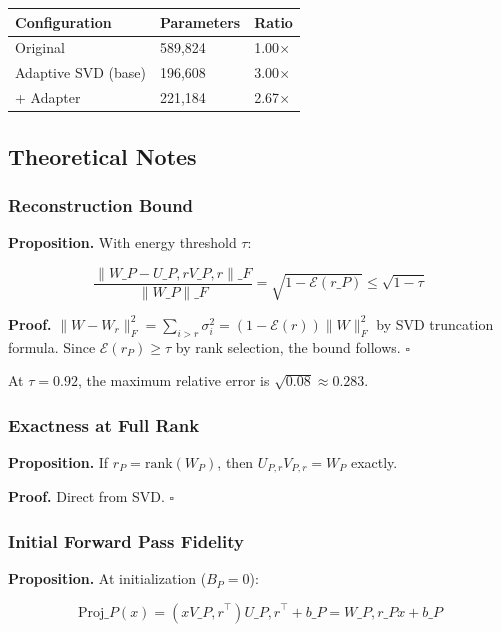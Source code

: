 \begin{table}[H]
\centering
\small
\begin{tabular}{lll}
\toprule
\textbf{Configuration} & \textbf{Parameters} & \textbf{Ratio} \\
\midrule
Original & 589,824 & 1.00$\times$ \\
Adaptive SVD (base) & 196,608 & 3.00$\times$ \\
+ Adapter & 221,184 & 2.67$\times$ \\
\bottomrule
\end{tabular}
\end{table}

\subsection{Theoretical Notes}

\subsubsection{Reconstruction Bound}

\textbf{Proposition.} With energy threshold $\tau$:

\[
\frac{\|W\_P - U\_{P, r} V\_{P, r}\|\_F}{\|W\_P\|\_F} = \sqrt{1 - \mathcal{E}(r\_P)} \leq \sqrt{1 - \tau}
\tag{4.11}
\]

\textbf{Proof.} $\|W - W_r\|_F^2 = \sum_{i > r} \sigma_i^2 = (1 - \mathcal{E}(r)) \|W\|_F^2$ by 
SVD truncation formula. Since $\mathcal{E}(r_P) \geq \tau$ by rank selection, 
the bound follows. $\square$

At $\tau = 0.92$, the maximum relative error is $\sqrt{0.08} \approx 0.283$.

\subsubsection{Exactness at Full Rank}

\textbf{Proposition.} If $r_P = \mathrm{rank}(W_P)$, then $U_{P, r} V_{P, r} = W_P$ exactly.

\textbf{Proof.} Direct from SVD. $\square$

\subsubsection{Initial Forward Pass Fidelity}

\textbf{Proposition.} At initialization ($B_P = 0$):

\[
\text{Proj}\_P(x) = (x V\_{P, r}^\top) U\_{P, r}^\top + b\_P = W\_{P, r\_P} x + b\_P
\tag{4.12}
\]

